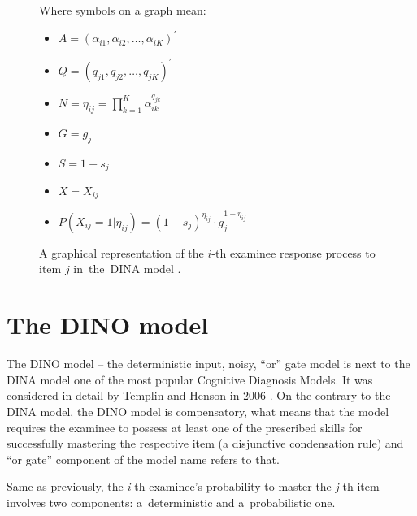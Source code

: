 \documentclass[english]{pwr_wmat_praca_dyplomowa}
\theoremstyle{plain}
\theoremstyle{definition}
\numberwithin{theorem}{chapter}
\begin{document}
\begin{figure}[h!]
\centering
\begin{multicols}{2}

	Where symbols on a graph mean:
	\begin{itemize}
		\item $A = (\alpha_{i1}, \alpha_{i2}, \ldots, \alpha_{iK} )^{'}$
		\item $Q = (q_{j1}, q_{j2}, \ldots, q_{jK} )^{'}$
		\item $N = \eta_{ij} = \prod\limits_{k=1}^{K} \alpha_{ik}^{q_{jk}}$
		\item $G = g_j$
		\item $S = 1-s_j$
		\item $X = X_{ij}$
		\item $P(X_{ij} = 1 | \eta_{ij}) = (1-s_j)^{\eta_{ij}} \cdot g_j^{1-\eta_{ij}}$
	\end{itemize}
\end{multicols} 
\caption{A graphical representation of the $i$-th examinee response process to item $j$ in~the~DINA model \cite{de_la_torre_2009}.}\label{graph_dina}
\end{figure}

\section{The DINO model}

The DINO model -- the deterministic input, noisy, ``or'' gate model is next to the DINA model one of the most popular Cognitive Diagnosis Models. It was considered in detail by Templin and Henson in 2006 \cite{dino_model}. On the contrary to the DINA model, the DINO model is compensatory, what means that the model requires the examinee to possess at least one of the prescribed skills for successfully mastering the respective item (a disjunctive condensation rule) and ``or gate'' component of the model name refers to that. 

Same as previously, the \textit{i}-th examinee's probability to master the \textit{j}-th item involves two components: a~deterministic and a~probabilistic one. 
\end{document}
